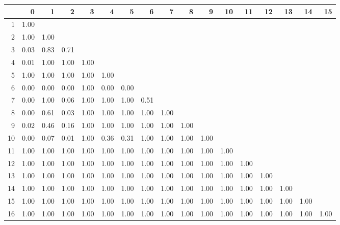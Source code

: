 \documentclass[a4paper,headsepline,footsepline,fontsize=11pt,BCOR=12mm,DIV=12]{report}
\begin{document}
\begin{tabular}{rrrrrrrrrrrrrrrrr}
  \hline
 & 0 & 1 & 2 & 3 & 4 & 5 & 6 & 7 & 8 & 9 & 10 & 11 & 12 & 13 & 14 & 15 \\ 
  \hline
1 & 1.00 &  &  &  &  &  &  &  &  &  &  &  &  &  &  &  \\ 
  2 & 1.00 & 1.00 &  &  &  &  &  &  &  &  &  &  &  &  &  &  \\ 
  3 & 0.03 & 0.83 & 0.71 &  &  &  &  &  &  &  &  &  &  &  &  &  \\ 
  4 & 0.01 & 1.00 & 1.00 & 1.00 &  &  &  &  &  &  &  &  &  &  &  &  \\ 
  5 & 1.00 & 1.00 & 1.00 & 1.00 & 1.00 &  &  &  &  &  &  &  &  &  &  &  \\ 
  6 & 0.00 & 0.00 & 0.00 & 1.00 & 0.00 & 0.00 &  &  &  &  &  &  &  &  &  &  \\ 
  7 & 0.00 & 1.00 & 0.06 & 1.00 & 1.00 & 1.00 & 0.51 &  &  &  &  &  &  &  &  &  \\ 
  8 & 0.00 & 0.61 & 0.03 & 1.00 & 1.00 & 1.00 & 1.00 & 1.00 &  &  &  &  &  &  &  &  \\ 
  9 & 0.02 & 0.46 & 0.16 & 1.00 & 1.00 & 1.00 & 1.00 & 1.00 & 1.00 &  &  &  &  &  &  &  \\ 
  10 & 0.00 & 0.07 & 0.01 & 1.00 & 0.36 & 0.31 & 1.00 & 1.00 & 1.00 & 1.00 &  &  &  &  &  &  \\ 
  11 & 1.00 & 1.00 & 1.00 & 1.00 & 1.00 & 1.00 & 1.00 & 1.00 & 1.00 & 1.00 & 1.00 &  &  &  &  &  \\ 
  12 & 1.00 & 1.00 & 1.00 & 1.00 & 1.00 & 1.00 & 1.00 & 1.00 & 1.00 & 1.00 & 1.00 & 1.00 &  &  &  &  \\ 
  13 & 1.00 & 1.00 & 1.00 & 1.00 & 1.00 & 1.00 & 1.00 & 1.00 & 1.00 & 1.00 & 1.00 & 1.00 & 1.00 &  &  &  \\ 
  14 & 1.00 & 1.00 & 1.00 & 1.00 & 1.00 & 1.00 & 1.00 & 1.00 & 1.00 & 1.00 & 1.00 & 1.00 & 1.00 & 1.00 &  &  \\ 
  15 & 1.00 & 1.00 & 1.00 & 1.00 & 1.00 & 1.00 & 1.00 & 1.00 & 1.00 & 1.00 & 1.00 & 1.00 & 1.00 & 1.00 & 1.00 &  \\ 
  16 & 1.00 & 1.00 & 1.00 & 1.00 & 1.00 & 1.00 & 1.00 & 1.00 & 1.00 & 1.00 & 1.00 & 1.00 & 1.00 & 1.00 & 1.00 & 1.00 \\ 
   \hline
\end{tabular}
\end{document}
